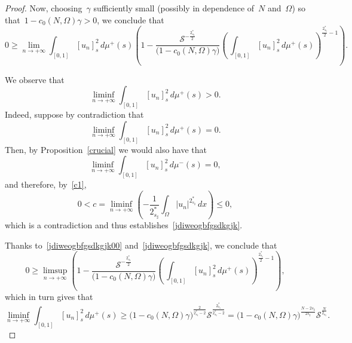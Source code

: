 \documentclass[10pt,a4paper]{amsart}
\renewcommand{\ge}{\geqslant}
\renewcommand{\le}{\leqslant}
\begin{document}
\begin{proof}
Now, choosing~$\gamma$ sufficiently small (possibly in dependence of~$N$
and~$\Omega$) so that~$1-c_0(N,\Omega)\gamma>0$, we conclude that
\begin{equation}\label{jdiweogbfgsdkgjk00}
0\ge \lim_{n\to+\infty} \int_{[{{ 0 }}, 1]} [u_n]^2_{s}\, d\mu^+ (s)
\left(1 - \frac{\mathcal{S}^{-\frac{2_{s_\sharp}^*}2}}{\big(1-c_0(N,\Omega)\gamma\big)}
\left(\, \int_{[{{ 0 }}, 1]} [u_n]^2_{s}\, d\mu^+ (s)\right)^{\frac{2_{s_\sharp}^*}2-1 }\right).
\end{equation}

We observe that
\begin{equation}\label{jdiweogbfgsdkgjk}
\liminf_{n\to+\infty} \int_{[{{ 0 }}, 1]} [u_n]^2_{s}\, d\mu^+ (s)>0.
\end{equation}
Indeed, suppose by contradiction that
\begin{equation*}
\liminf_{n\to+\infty} \int_{[{{ 0 }}, 1]} [u_n]^2_{s}\, d\mu^+ (s)=0.
\end{equation*}
Then, by Proposition~\ref{crucial} we would also have that
\begin{equation*}
\liminf_{n\to+\infty} \int_{[{{ 0 }}, 1]} [u_n]^2_{s}\, d\mu^- (s)=0,
\end{equation*}
and therefore, by~\eqref{c1},
\begin{equation*}
0<c=\liminf_{n\to+\infty}\left(-\frac{1}{2_{s_\sharp}^*} \int_\Omega |u_n|^{2_{s_\sharp}^*}\, dx\right)\le 0,
\end{equation*}
which is a contradiction and thus establishes~\eqref{jdiweogbfgsdkgjk}.

Thanks to~\eqref{jdiweogbfgsdkgjk00} and~\eqref{jdiweogbfgsdkgjk},
we conclude that
\begin{equation*}
0\ge \limsup_{n\to+\infty} 
\left(1 - \frac{\mathcal{S}^{-\frac{2_{s_\sharp}^*}2}}{\big(1-c_0(N,\Omega)\gamma\big)}
\left(\, \int_{[{{ 0 }}, 1]} [u_n]^2_{s}\, d\mu^+ (s)\right)^{\frac{2_{s_\sharp}^*}2-1 }\right),
\end{equation*}
which in turn gives that
\begin{equation}\label{dhuwegi4utg4u3gtu43}
\liminf_{n\to+\infty}\int_{[{{ 0 }}, 1]} [u_n]^2_{s}\, d\mu^+ (s)\ge\big(1-c_0(N,\Omega)\gamma\big)^{\frac2{2_{s_\sharp}^*-2} }
\mathcal{S}^{\frac{2_{s_\sharp}^*}{2_{s_\sharp}^*-2}}
=\big(1-c_0(N,\Omega)\gamma\big)^{\frac{N-2s_\sharp}{2s_\sharp} }
\mathcal{S}^{\frac{N}{2_{s_\sharp}}}.
\end{equation}


\end{proof}
\end{document}
